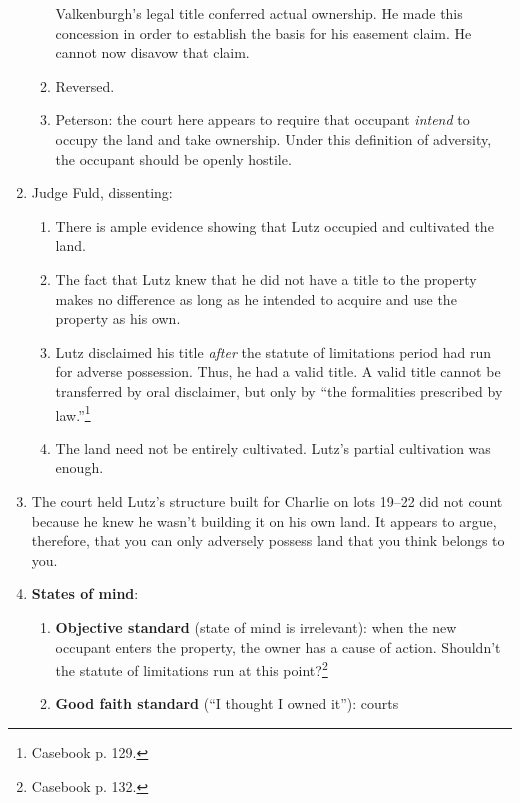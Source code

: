 \begin{enumerate}
\begin{enumerate}
        Valkenburgh's legal title conferred actual ownership. He made this 
        concession in order to establish the basis for his easement claim. 
        He cannot now disavow that claim.
        \item Reversed.
        \item Peterson: the court here appears to require that occupant 
        \emph{intend} to occupy the land and take ownership. Under this 
        definition of adversity, the occupant should be openly hostile.
    \end{enumerate}
    \item Judge Fuld, dissenting:
    \begin{enumerate}
        \item There is ample evidence showing that Lutz occupied and 
        cultivated the land.
        \item The fact that Lutz knew that he did not have a title to the 
        property makes no difference as long as he intended to acquire and use 
        the property as his own.
        \item Lutz disclaimed his title \emph{after} the statute of 
        limitations period had run for adverse possession. Thus, he had a 
        valid title. A valid title cannot be transferred by oral disclaimer, 
        but only by ``the formalities prescribed by law.''\footnote{Casebook 
        p. 129.}
        \item The land need not be entirely cultivated. Lutz's partial 
        cultivation was enough.
    \end{enumerate}
    \item The court held Lutz's structure built for Charlie on 
    lots 19--22 did not count because he knew he wasn't building it on his own 
    land. It appears to argue, therefore, that you can only adversely possess land 
    that you think belongs to you.
    \item \textbf{States of mind}:
    \begin{enumerate}
        \item \textbf{Objective standard} (state of mind is irrelevant): when 
        the new occupant enters the property, the owner has a cause of action. 
        Shouldn't the statute of limitations run at this 
        point?\footnote{Casebook p. 132.}
        \item \textbf{Good faith standard} (``I thought I owned it''): courts 

\end{enumerate}
\end{enumerate}
